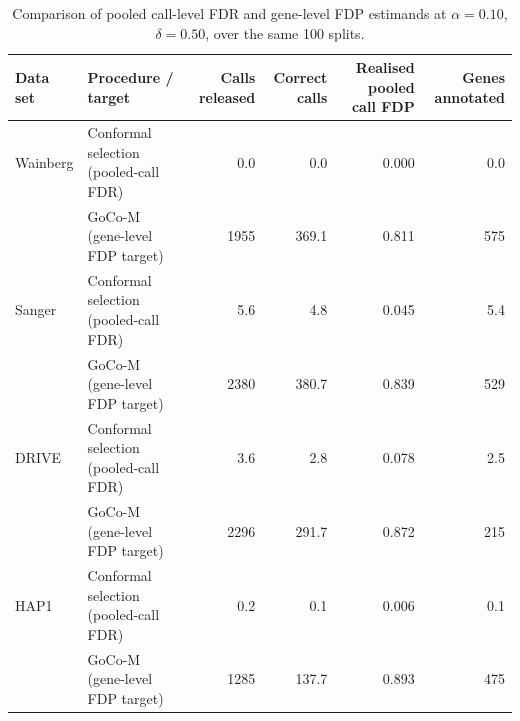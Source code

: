 \begin{table}[!htbp]
\centering
\caption{Comparison of pooled call-level FDR and gene-level FDP estimands at $\alpha=0.10$, $\delta=0.50$, over the same 100 splits.}
\label{tab:estimands}
\scriptsize
\begin{tabular}{l l rrrr}
\toprule
Data set & Procedure / target & Calls released & Correct calls & Realised pooled call FDP & Genes annotated \\ \midrule
Wainberg & Conformal selection (pooled-call FDR) & 0.0 & 0.0 & 0.000 & 0.0 \\
 & GoCo-M (gene-level FDP target) & 1955 & 369.1 & 0.811 & 575 \\
\addlinespace
Sanger & Conformal selection (pooled-call FDR) & 5.6 & 4.8 & 0.045 & 5.4 \\
 & GoCo-M (gene-level FDP target) & 2380 & 380.7 & 0.839 & 529 \\
\addlinespace
DRIVE & Conformal selection (pooled-call FDR) & 3.6 & 2.8 & 0.078 & 2.5 \\
 & GoCo-M (gene-level FDP target) & 2296 & 291.7 & 0.872 & 215 \\
\addlinespace
HAP1 & Conformal selection (pooled-call FDR) & 0.2 & 0.1 & 0.006 & 0.1 \\
 & GoCo-M (gene-level FDP target) & 1285 & 137.7 & 0.893 & 475 \\
\bottomrule
\end{tabular}
\end{table}

